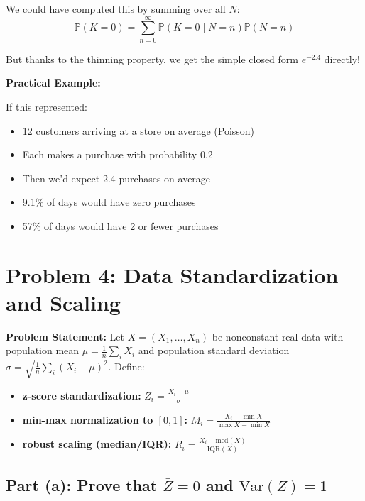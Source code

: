 \documentclass[12pt]{article}
\begin{document}
\begin{explanation}
We could have computed this by summing over all \(N\):
\[
\mathbb{P}(K = 0) = \sum_{n=0}^{\infty} \mathbb{P}(K = 0 \mid N = n) \mathbb{P}(N = n)
\]

But thanks to the thinning property, we get the simple closed form \(e^{-2.4}\) directly!

\textbf{Practical Example:}

If this represented:
\begin{itemize}
    \item 12 customers arriving at a store on average (Poisson)
    \item Each makes a purchase with probability 0.2
    \item Then we'd expect 2.4 purchases on average
    \item 9.1\% of days would have zero purchases
    \item 57\% of days would have 2 or fewer purchases
\end{itemize}
\end{explanation}

\section{Problem 4: Data Standardization and Scaling}

\textbf{Problem Statement:} Let \(X=(X_{1},\ldots,X_{n})\) be nonconstant real data with population mean \(\mu=\frac{1}{n}\sum_{i}X_{i}\) and population standard deviation \(\sigma=\sqrt{\frac{1}{n}\sum_{i}(X_{i}-\mu)^{2}}\). Define:
\begin{itemize}
\item \textbf{z-score standardization:} \(Z_{i}=\frac{X_{i}-\mu}{\sigma}\)
\item \textbf{min-max normalization to \([0,1]\):} \(M_{i}=\frac{X_{i}-\min X}{\max X-\min X}\)
\item \textbf{robust scaling (median/IQR):} \(R_{i}=\frac{X_{i}-\mathrm{med}(X)}{\mathrm{IQR}(X)}\)
\end{itemize}

\subsection{Part (a): Prove that \(\bar{Z}=0\) and \(\text{Var}(Z)=1\)}
\end{document}
